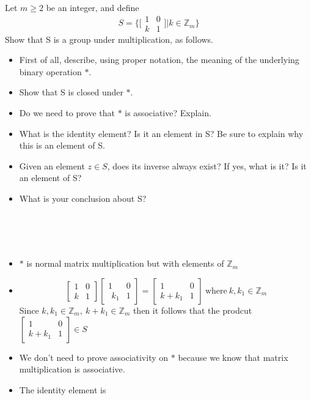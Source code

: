 \documentclass[titlepage]{article}
\newenvironment{problem}[2][Problem]{\begin{trivlist}
\item[\hskip \labelsep {\bfseries #1}\hskip \labelsep {\bfseries #2.}]}{\end{trivlist}}
\begin{document}
\begin{problem}{8}
	Let $m \geq 2$ be an integer, and define
$$S = \bigg\{\bigg[\begin{array}{cc} 1&0 \\ k&1 \end{array}\bigg] \bigg| k \in \mathbb{Z}_m\bigg\}$$
Show that S is a group under multiplication, as follows.
\begin{itemize}
	\item[(a)] First of all, describe, using proper notation, the meaning of the underlying binary operation $*$.
	\item[(b)] Show that S is closed under $*$.
	\item[(c)] Do we need to prove that $*$ is associative? Explain.
	\item[(d)] What is the identity element? Is it an element in S? Be sure to explain why this is an element of S.
	\item[(e)] Given an element $z \in S$, does its inverse always exist? If yes, what is it? Is it an element of S?
	\item[(f)] What is your conclusion about S?
\end{itemize}
\ \\ \\ \\
\begin{itemize}
	\item[(a)]$*$ is normal matrix multiplication but with elements of $\mathbb{Z}_m$
	\item[(b)]
		$$\begin{bmatrix}
			1 & 0 \\ k & 1
		\end{bmatrix} 
		\begin{bmatrix}
			1 & 0 \\ \phantom{_1}k_1 & 1
		\end{bmatrix}
		=
		\begin{bmatrix}
			1&0 \\ k+k_1&1
		\end{bmatrix} \ \text{where} \ k,k_1 \in \mathbb{Z}_m$$
			Since $k, k_1 \in \mathbb{Z}_m, \ k+k_1 \in \mathbb{Z}_m$ then it follows that the prodcut $\begin{bmatrix}1&0 \\ k+k_1 & 1\end{bmatrix} \in S$
	\item[(c)] We don't need to prove associativity on $*$ because we know that matrix multiplication is associative.
	\item[(d)] The identity element is

\end{itemize}
\end{problem}
\end{document}

